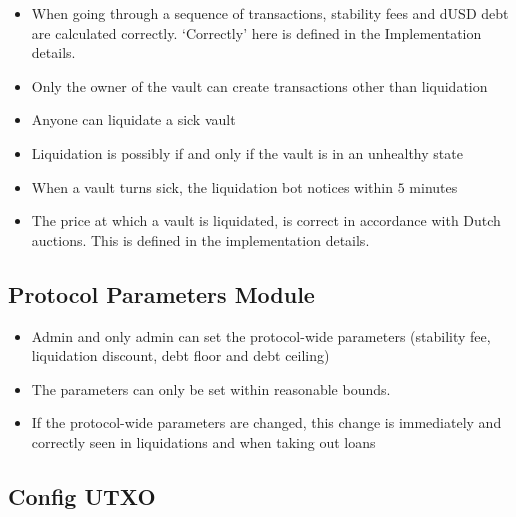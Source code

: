 \documentclass{article} %
\begin{document}
\begin{itemize}
% 
  \item When going through a sequence of transactions, stability fees and dUSD
    debt are calculated correctly. `Correctly' here is defined in the
    Implementation details.
  \item Only the owner of the vault can create transactions other than
    liquidation
  \item Anyone can liquidate a sick vault
  \item Liquidation is possibly if and only if the vault is in an unhealthy
    state
  \item When a vault turns sick, the liquidation bot notices within $5$ minutes
  \item The price at which a vault is liquidated, is correct in accordance with
    Dutch auctions. This is defined in the implementation details.
\end{itemize}


\subsection{Protocol Parameters Module}

\begin{itemize}
  \item Admin and only admin can set the protocol-wide parameters (stability
    fee, liquidation discount, debt floor and debt ceiling)
  \item The parameters can only be set within reasonable bounds. 
  \item If the protocol-wide parameters are changed, this change is immediately
    and correctly seen in liquidations and when taking out loans
\end{itemize}  

\subsection{Config UTXO}


\end{document}
